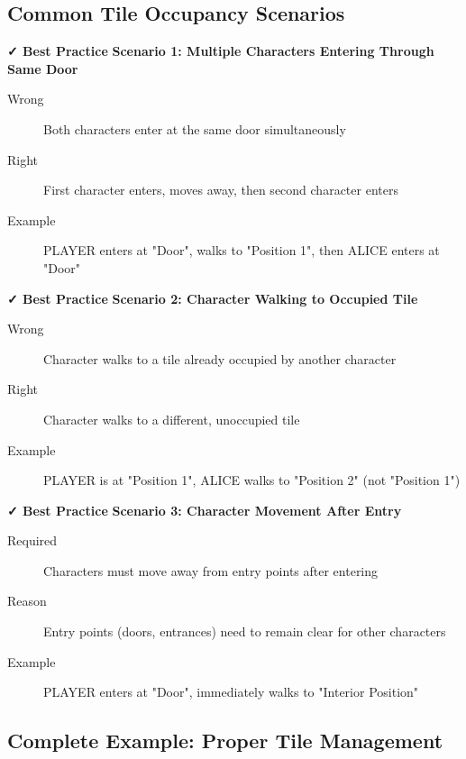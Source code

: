 \documentclass[11pt,letterpaper,oldstylefigures]{memoir}
\begin{document}
\subsection{Common Tile Occupancy Scenarios}

\textbf{✓ Best Practice}
\textbf{Scenario 1: Multiple Characters Entering Through Same Door}
\begin{description}
\item[Wrong] Both characters enter at the same door simultaneously
\item[Right] First character enters, moves away, then second character enters
\item[Example] PLAYER enters at "Door", walks to "Position 1", then ALICE enters at "Door"
\end{description}


\textbf{✓ Best Practice}
\textbf{Scenario 2: Character Walking to Occupied Tile}
\begin{description}
\item[Wrong] Character walks to a tile already occupied by another character
\item[Right] Character walks to a different, unoccupied tile
\item[Example] PLAYER is at "Position 1", ALICE walks to "Position 2" (not "Position 1")
\end{description}


\textbf{✓ Best Practice}
\textbf{Scenario 3: Character Movement After Entry}
\begin{description}
\item[Required] Characters must move away from entry points after entering
\item[Reason] Entry points (doors, entrances) need to remain clear for other characters
\item[Example] PLAYER enters at "Door", immediately walks to "Interior Position"
\end{description}


\subsection{Complete Example: Proper Tile Management}
\end{document}
